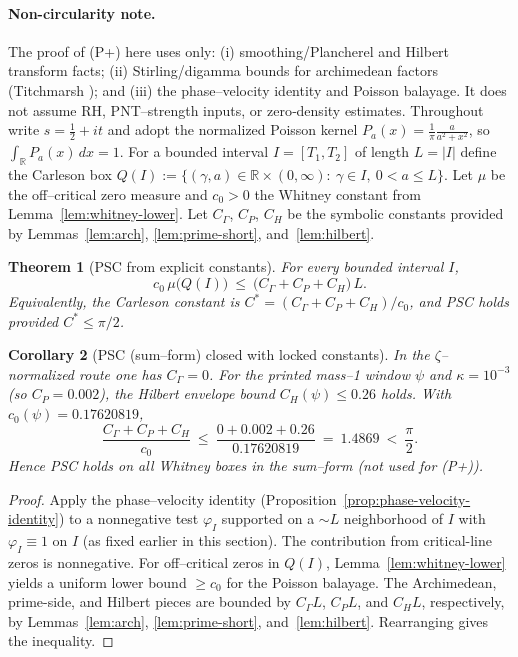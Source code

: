 \documentclass[11pt]{article}
\newtheorem{theorem}{Theorem}
\newtheorem{corollary}[theorem]{Corollary}
\theoremstyle{definition}
\theoremstyle{remark}
\newcommand{\R}{\mathbb{R}}
\begin{document}
\paragraph{Non-circularity note.}
The proof of (P+) here uses only: (i) smoothing/Plancherel and Hilbert transform facts; (ii) Stirling/digamma bounds for archimedean factors (Titchmarsh \cite[Ch.~IV]{TitchmarshZeta}); and (iii) the phase–velocity identity and Poisson balayage. It does not assume RH, PNT–strength inputs, or zero‑density estimates.
Throughout write $s=\tfrac12+it$ and adopt the normalized Poisson kernel $P_a(x)=\tfrac{1}{\pi}\tfrac{a}{a^2+x^2}$, so $\int_\R P_a(x)\,dx=1$. For a bounded interval $I=[T_1,T_2]$ of length $L=|I|$ define the Carleson box $Q(I):=\{(\gamma,a)\in\R\times(0,\infty):\ \gamma\in I,\ 0<a\le L\}$. Let $\mu$ be the off--critical zero measure and $c_0>0$ the Whitney constant from Lemma~\ref{lem:whitney-lower}. Let $C_\Gamma$, $C_P$, $C_H$ be the symbolic constants provided by Lemmas~\ref{lem:arch}, \ref{lem:prime-short}, and~\ref{lem:hilbert}.
\begin{theorem}[PSC from explicit constants]\label{thm:psc-constants}
For every bounded interval $I$,
\[ c_0\,\mu\big(Q(I)\big)\ \le\ \big(C_\Gamma + C_P + C_H\big)\,L. \]
Equivalently, the Carleson constant is $C^*=(C_\Gamma + C_P + C_H)/c_0$, and PSC holds provided $C^*\le \pi/2$.
\end{theorem}
\begin{corollary}[PSC (sum--form) closed with locked constants]\label{cor:psc-locked}
In the $\zeta$--normalized route one has $C_\Gamma=0$. For the printed mass--1 window $\psi$ and $\kappa=10^{-3}$ (so $C_P=0.002$), the Hilbert envelope bound \(C_H(\psi)\le 0.26\) holds. With \(c_0(\psi)=0.17620819\),
\[
  \frac{C_\Gamma + C_P + C_H}{c_0}\ \le\ \frac{0 + 0.002 + 0.26}{0.17620819}\ =\ 1.4869\ <\ \frac{\pi}{2}.
\]
Hence PSC holds on all Whitney boxes in the sum--form (not used for (P+)).
\end{corollary}
\begin{proof}
Apply the phase--velocity identity (Proposition~\ref{prop:phase-velocity-identity}) to a nonnegative test $\varphi_I$ supported on a $\sim L$ neighborhood of $I$ with $\varphi_I\equiv 1$ on $I$ (as fixed earlier in this section). The contribution from critical-line zeros is nonnegative. For off--critical zeros in $Q(I)$, Lemma~\ref{lem:whitney-lower} yields a uniform lower bound $\ge c_0$ for the Poisson balayage. The Archimedean, prime-side, and Hilbert pieces are bounded by $C_\Gamma L$, $C_P L$, and $C_H L$, respectively, by Lemmas~\ref{lem:arch}, \ref{lem:prime-short}, and~\ref{lem:hilbert}. Rearranging gives the inequality.
\end{proof}
\end{document}
